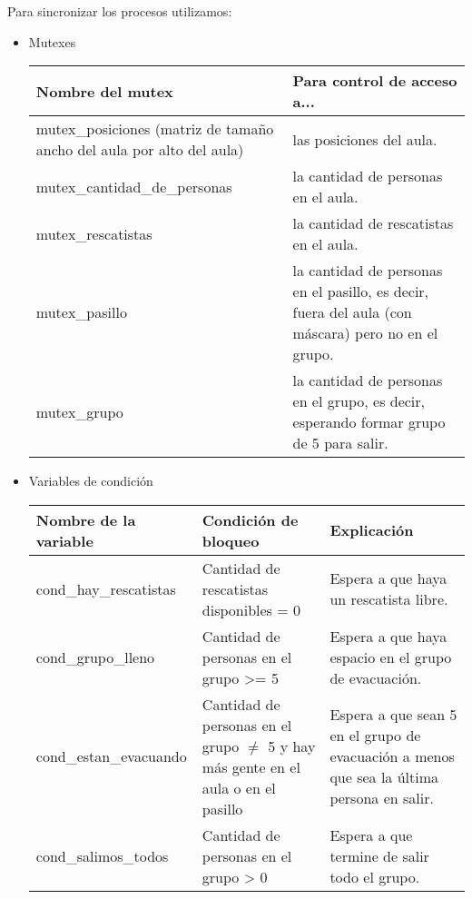 Para sincronizar los procesos utilizamos:

\begin{itemize}
\item Mutexes
  \medskip

  \begin{tabular}{|p{7.5cm}|p{9cm}|}
  \hline
  \textbf{Nombre del mutex} & \textbf{Para control de acceso a...} \\
  \hline
  mutex\_posiciones (matriz de tamaño ancho del aula por alto del aula) & las posiciones del aula. \\
  \hline
  mutex\_cantidad\_de\_personas & la cantidad de personas en el aula. \\
  \hline
  mutex\_rescatistas & la cantidad de rescatistas en el aula. \\
  \hline
  mutex\_pasillo & la cantidad de personas en el pasillo, es decir, fuera del aula (con máscara) pero no en el grupo. \\
  \hline
  mutex\_grupo & la cantidad de personas en el grupo, es decir, esperando formar grupo de 5 para salir. \\
  \hline
  \end{tabular}

\item Variables de condición
  \medskip

  \begin{tabular}{|l|p{5cm}|p{7cm}|}
  \hline
  \textbf{Nombre de la variable} & \textbf{Condición de bloqueo} & \textbf{Explicación}  \\
  \hline
  cond\_hay\_rescatistas & Cantidad de rescatistas disponibles = 0 & Espera a que haya un rescatista libre. \\ %
  \hline
  cond\_grupo\_lleno & Cantidad de personas en el grupo >= 5 & Espera a que haya espacio en el grupo de evacuación. \\ %
  \hline
  cond\_estan\_evacuando & Cantidad de personas en el grupo $\neq$ 5 y hay más gente en el aula o en el pasillo & Espera a que sean 5 en el grupo de 
    evacuación a menos que sea la última persona en salir. \\ %
  \hline
  cond\_salimos\_todos & Cantidad de personas en el grupo > 0 & Espera a que termine de salir todo el grupo. \\ %
  \hline
  \end{tabular}

\end{itemize}